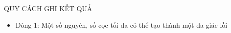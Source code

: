 QUY CÁCH GHI KẾT QUẢ
\begin{itemize}
	\item     Dòng 1: Một số nguyên, số cọc tối đa có thể tạo thành một đa giác lồi   
\end{itemize}